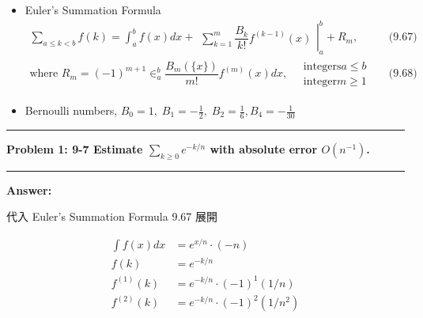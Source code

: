 \documentclass[11pt,fleqn]{article}
\newcommand\question[2]{\vspace{.25in}\hrule\textbf{#1: #2}\vspace{.5em}\hrule\vspace{.10in}}
\renewcommand\part[1]{\vspace{.10in}\textbf{#1}}
\begin{document}
\raggedright
\newcommand\NAME{Shiang-Yun Yang 楊翔雲}  %
\newcommand\ANDREWID{R04922067}     %
\newcommand\HWNUM{9}              %


\begin{itemize}
	\item Euler's Summation Formula 
		\begin{align*}
			\sum_{a \le k < b} f(k) = \int^{b}_{a} f(x) dx + 
				\left.\begin{matrix} \sum\limits_{k=1}^{m} \dfrac{B_k}{k!} f^{(k-1)} (x) \end{matrix}\right|^{b}_{a} + R_m, && \text{(9.67)}\\
			\text{where } R_m = (-1)^{m+1} \in^{b}_{a} \dfrac{B_m(\{x\})}{m!} f^{(m)}(x) dx,
				\quad
				\begin{matrix}
					\text{integers} a \le b \\
					\text{integer} m \ge 1
				\end{matrix}
				&& \text{(9.68)}
		\end{align*}
	\item Bernoulli numbers, $B_0 = 1, \; B_1 = -\frac{1}{2}, \; B_2 = \frac{1}{6}, B_4 = -\frac{1}{30}$
\end{itemize}

\question{Problem 1} {9-7 Estimate $\sum_{k \ge 0} e^{-k/n}$ with absolute
	error $O(n^{-1})$.
}

\part{Answer:}

代入 Euler's Summation Formula 9.67 展開

\begin{align*}
	\int f(x) dx &= e^{x/n} \cdot (-n) \\
	f(k) &= e^{-k/n} \\
	f^{(1)}(k) &= e^{-k/n} \cdot (-1)^1(1/n) \\
	f^{(2)}(k) &= e^{-k/n} \cdot (-1)^2(1/n^2)
\end{align*}
\end{document}
